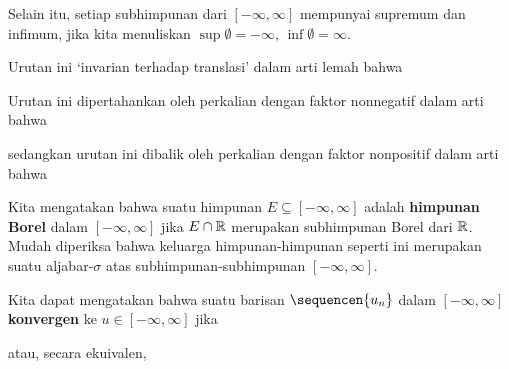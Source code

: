 \noindent Selain itu, setiap subhimpunan dari $[-\infty,\infty]$ mempunyai
supremum dan infimum, jika kita menuliskan $\sup\emptyset=-\infty$,
$\inf\emptyset=\infty$.

 Urutan ini `invarian terhadap translasi' dalam
arti lemah bahwa


\noindent Urutan ini dipertahankan oleh perkalian dengan faktor nonnegatif dalam arti
bahwa


\noindent sedangkan urutan ini dibalik oleh perkalian dengan faktor nonpositif dalam
arti bahwa


 Kita mengatakan
bahwa suatu himpunan $E\subseteq[-\infty,\infty]$ adalah {\bf himpunan
Borel} dalam $[-\infty,\infty]$ jika $E\cap\Bbb R$ merupakan subhimpunan
Borel dari $\Bbb R$. Mudah diperiksa bahwa keluarga himpunan-himpunan
seperti ini merupakan suatu aljabar-$\sigma$ atas subhimpunan-subhimpunan
$[-\infty,\infty]$. 

\ifnum{}\ifresultsonly\eject\fi\fi

 Kita dapat
mengatakan bahwa suatu barisan $\sequencen{u_n}$ dalam
$[-\infty,\infty]$ {\bf konvergen} ke $u\in[-\infty,\infty]$ jika


\noindent atau, secara ekuivalen,




